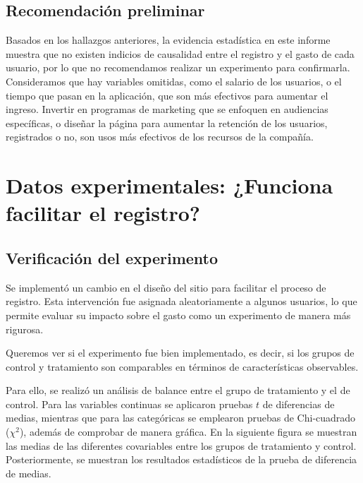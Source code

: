 \documentclass[conference]{IEEEtran}
\begin{document}
\subsection{Recomendación preliminar}


Basados en los hallazgos anteriores, la evidencia estadística en este informe muestra que no existen indicios de causalidad 
entre el registro y el gasto de cada usuario, por lo que no recomendamos realizar un experimento para confirmarla. Consideramos que hay variables omitidas, como el salario de los usuarios, o el tiempo que pasan en la aplicación, que son más efectivos para aumentar el ingreso. 
Invertir en programas de marketing que se enfoquen en audiencias específicas, o diseñar la página para aumentar la retención de los usuarios, registrados o no, son usos más efectivos de los recursos de la compañía.



\section{Datos experimentales: ¿Funciona facilitar el registro?}

\subsection{Verificación del experimento}

Se implementó un cambio en el diseño del sitio para facilitar el proceso de registro. 
Esta intervención fue asignada aleatoriamente a algunos usuarios, lo que permite evaluar su impacto sobre el gasto 
como un experimento de manera más rigurosa.

Queremos ver si el experimento fue bien implementado, es decir, si los grupos de control y tratamiento son comparables en términos de características observables.

Para ello, se realizó un análisis de balance entre el grupo de tratamiento y el de control. Para las variables continuas se aplicaron pruebas $t$ de diferencias de medias, mientras que para las categóricas se emplearon pruebas de Chi-cuadrado ($\chi^2$), además de comprobar de manera gráfica.
En la siguiente figura se muestran las medias de las diferentes covariables entre los grupos de tratamiento y control. Posteriormente, se muestran los resultados 
estadísticos de la prueba de diferencia de medias.
\end{document}

